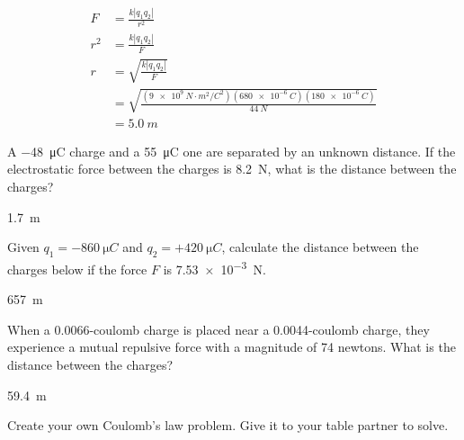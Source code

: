 \documentclass[answers]{exam}
\begin{document}
\begin{questions}
\begin{solution}
\begin{align*}
    F &= \frac{k \left|q_1 q_2\right|}{r^2} \\[1ex]
    r^2 &= \frac{k \left|q_1 q_2\right|}{F} \\[1ex]
    r &= \sqrt{\frac{k \left|q_1 q_2\right|}{F}} \\[1ex]
      &= \sqrt{\frac{\left(\SI{9e9}{N\cdot m^2/C^2}\right)(\SI{680e-6}{C})(\SI{180e-6}{C})}{\SI{44}{N}}} \\[1ex]
      &= \boxed{\SI{5.0}{m}}
\end{align*}
\end{solution}


\question \label{clmO0M}
A \SI{-48}{\micro C} charge and a \SI{55}{\micro C} one are separated by an unknown distance. If the electrostatic force between the charges is \SI{8.2}{N}, what is the distance between the charges?

\begin{solution}
\SI{1.7}{m}
\end{solution}

\question \label{TrRzFe}
Given $q_1 = \SI{-860}{\micro C}$ and $q_2 = +\SI{420}{\micro C}$, calculate the distance between the charges below if the force $F$ is \SI{7.53e-3}{N}.

\begin{center}
\end{center}


\begin{solution}
\SI{657}{m}
\end{solution}


\question \label{bpbHHg}
When a 0.0066-coulomb charge is placed near a 0.0044-coulomb charge, they experience a mutual repulsive force with a magnitude of 74 newtons. What is the distance between the charges?

\begin{solution}
\SI{59.4}{m}
\end{solution}



\question \label{DOuqpT}
Create your own Coulomb's law problem. Give it to your table partner to solve.

\end{questions}
\end{document}
